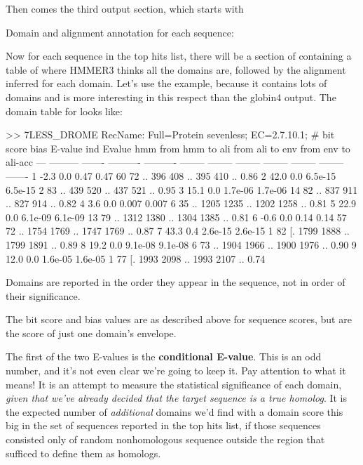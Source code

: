 Then comes the third output section, which starts with

\begin{sreoutput}
Domain and alignment annotation for each sequence:
\end{sreoutput}

Now for each sequence in the top hits list, there will be a section of
containing a table of where HMMER3 thinks all the domains are,
followed by the alignment inferred for each domain. Let's use the
 example, because it contains lots of domains
and is more interesting in this respect than the globin4 output.  The
domain table for  looks like:

\begin{sreoutput}
>> 7LESS_DROME  RecName: Full=Protein sevenless;          EC=2.7.10.1;
     # bit score    bias    E-value ind Evalue hmm from   hmm to    ali from   ali to    env from   env to    ali-acc
   --- --------- ------- ---------- ---------- -------- --------    -------- --------    -------- --------    -------
     1      -2.3     0.0       0.47       0.47       60       72 ..      396      408 ..      395      410 ..    0.86
     2      42.0     0.0    6.5e-15    6.5e-15        2       83 ..      439      520 ..      437      521 ..    0.95
     3      15.1     0.0    1.7e-06    1.7e-06       14       82 ..      837      911 ..      827      914 ..    0.82
     4       3.6     0.0      0.007      0.007        6       35 ..     1205     1235 ..     1202     1258 ..    0.81
     5      22.9     0.0    6.1e-09    6.1e-09       13       79 ..     1312     1380 ..     1304     1385 ..    0.81
     6      -0.6     0.0       0.14       0.14       57       72 ..     1754     1769 ..     1747     1769 ..    0.87
     7      43.3     0.4    2.6e-15    2.6e-15        1       82 [.     1799     1888 ..     1799     1891 ..    0.89
     8      19.2     0.0    9.1e-08    9.1e-08        6       73 ..     1904     1966 ..     1900     1976 ..    0.90
     9      12.0     0.0    1.6e-05    1.6e-05        1       77 [.     1993     2098 ..     1993     2107 ..    0.74
\end{sreoutput}

Domains are reported in the order they appear in the sequence, not in
order of their significance.

The bit score and bias values are as described above for sequence
scores, but are the score of just one domain's envelope. 

The first of the two E-values is the \textbf{conditional
E-value}. This is an odd number, and it's not even clear we're going
to keep it. Pay attention to what it means! It is an attempt to
measure the statistical significance of each domain, \emph{given that
we've already decided that the target sequence is a true homolog}.  It
is the expected number of \emph{additional} domains we'd find with a
domain score this big in the set of sequences reported in the top hits
list, if those sequences consisted only of random nonhomologous
sequence outside the region that sufficed to define them as homologs. 

